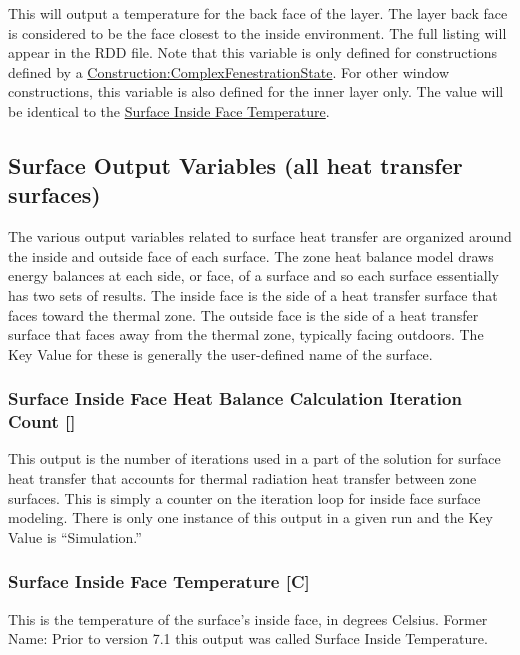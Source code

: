 This will output a temperature for the back face of the layer. The layer back face is considered to be the face closest to the inside environment. The full listing will appear in the RDD file. Note that this variable is only defined for constructions defined by a \hyperref[constructioncomplexfenestrationstate]{Construction:ComplexFenestrationState}.  For other window constructions, this variable is also defined for the inner layer only. The value will be identical to the \hyperref[surface-inside-face-temperature-c]{Surface Inside Face Temperature}.

\subsection{Surface Output Variables (all heat transfer surfaces)}\label{surface-output-variables-all-heat-transfer-surfaces}

The various output variables related to surface heat transfer are organized around the inside and outside face of each surface. The zone heat balance model draws energy balances at each side, or face, of a surface and so each surface essentially has two sets of results. The inside face is the side of a heat transfer surface that faces toward the thermal zone. The outside face is the side of a heat transfer surface that faces away from the thermal zone, typically facing outdoors. The Key Value for these is generally the user-defined name of the surface.

\subsubsection{Surface Inside Face Heat Balance Calculation Iteration Count {[]}}\label{surface-inside-face-heat-balance-calculation-iteration-count}

This output is the number of iterations used in a part of the solution for surface heat transfer that accounts for thermal radiation heat transfer between zone surfaces. This is simply a counter on the iteration loop for inside face surface modeling. There is only one instance of this output in a given run and the Key Value is ``Simulation.''

\subsubsection{Surface Inside Face Temperature {[}C{]}}\label{surface-inside-face-temperature-c}

This is the temperature of the surface's inside face, in degrees Celsius. Former Name: Prior to version 7.1 this output was called Surface Inside Temperature.

